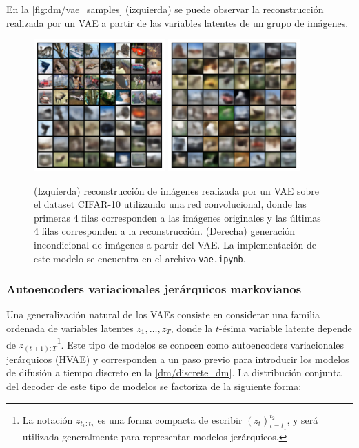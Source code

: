 En la \autoref{fig:dm/vae_samples} (izquierda) se puede observar la reconstrucción realizada por un VAE a partir de las variables latentes de un grupo de imágenes.

\begin{figure}
    \centering
    \includegraphics[width=0.45\textwidth]{images/dm/vae_reconstruction}
    \includegraphics[width=0.45\textwidth]{images/dm/vae_samples}
    \caption{(Izquierda) reconstrucción de imágenes realizada por un VAE sobre el dataset CIFAR-10 utilizando una red convolucional, donde las primeras 4 filas corresponden a las imágenes originales y las últimas 4 filas corresponden a la reconstrucción. (Derecha) generación incondicional de imágenes a partir del VAE. La implementación de este modelo se encuentra en el archivo \texttt{vae.ipynb}.}
    \label{fig:dm/vae_samples}
\end{figure}

\subsubsection{Autoencoders variacionales jerárquicos markovianos}

Una generalización natural de los VAEs consiste en considerar una familia ordenada de variables latentes $z_1,\ldots,z_T$, donde la $t$-ésima variable latente depende de $z_{(t+1):T}$\footnote{La notación $z_{t_1:t_2}$ es una forma compacta de escribir $(z_t)_{t=t_1}^{t_2}$, y será utilizada generalmente para representar modelos jerárquicos.}. Este tipo de modelos se conocen como autoencoders variacionales jerárquicos (HVAE) y corresponden a un paso previo para introducir los modelos de difusión a tiempo discreto en la \autoref{dm/discrete_dm}. La distribución conjunta del decoder de este tipo de modelos se factoriza de la siguiente forma:

